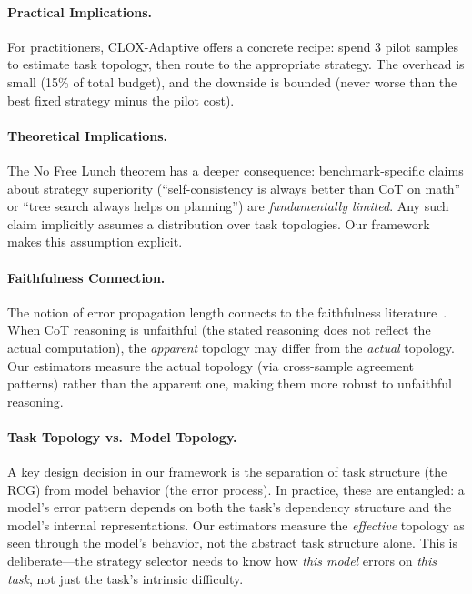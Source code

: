 \documentclass{article}
\begin{document}
\paragraph{Practical Implications.} For practitioners, CLOX-Adaptive offers a concrete recipe: spend 3 pilot samples to estimate task topology, then route to the appropriate strategy. The overhead is small (15\% of total budget), and the downside is bounded (never worse than the best fixed strategy minus the pilot cost).

\paragraph{Theoretical Implications.} The No Free Lunch theorem has a deeper consequence: benchmark-specific claims about strategy superiority (``self-consistency is always better than CoT on math'' or ``tree search always helps on planning'') are \emph{fundamentally limited}. Any such claim implicitly assumes a distribution over task topologies. Our framework makes this assumption explicit.

\paragraph{Faithfulness Connection.} The notion of error propagation length connects to the faithfulness literature~\citep{lanham2023measuring, turpin2024language}. When CoT reasoning is unfaithful (the stated reasoning does not reflect the actual computation), the \emph{apparent} topology may differ from the \emph{actual} topology. Our estimators measure the actual topology (via cross-sample agreement patterns) rather than the apparent one, making them more robust to unfaithful reasoning.

\paragraph{Task Topology vs.\ Model Topology.} A key design decision in our framework is the separation of task structure (the RCG) from model behavior (the error process). In practice, these are entangled: a model's error pattern depends on both the task's dependency structure and the model's internal representations. Our estimators measure the \emph{effective} topology as seen through the model's behavior, not the abstract task structure alone. This is deliberate---the strategy selector needs to know how \emph{this model} errors on \emph{this task}, not just the task's intrinsic difficulty.
\end{document}
